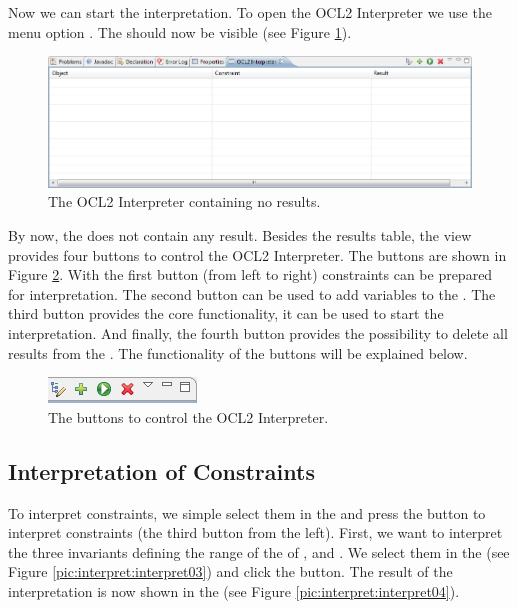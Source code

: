 Now we can start the interpretation. To open the \acs{OCL}2 Interpreter we use the menu option . The  should now be visible (see Figure \ref{pic:interpret:interpret01}).

\begin{figure}[!htbp]
	\centering
	\includegraphics[width=1.0\linewidth]{figures/interpreter/interpret01}
	\caption{The OCL2 Interpreter containing no results.}
	\label{pic:interpret:interpret01}
\end{figure}

By now, the  does not contain any result. Besides the results table, the view provides four buttons to control the \acs{OCL}2 Interpreter. The buttons are shown in Figure \ref{pic:interpret:interpret02}. With the first button (from left to right) constraints can be prepared for interpretation. The second button can be used to add variables to the . The third button provides the core functionality, it can be used to start the interpretation. And finally, the fourth button provides the possibility to delete all results from the . The functionality of the buttons will be explained below.

\begin{figure}[!htbp]
	\centering
	\includegraphics[width=0.5\linewidth]{figures/interpreter/interpret02}
	\caption{The buttons to control the OCL2 Interpreter.}
	\label{pic:interpret:interpret02}
\end{figure}


\subsection{Interpretation of Constraints}

To interpret constraints, we simple select them in the  and press the button to interpret constraints (the third button from the left). First, we want to interpret the three invariants defining the range of the  of ,  and . We select them in the  (see Figure \ref{pic:interpret:interpret03}) and click the  button. The result of the interpretation is now shown in the  (see Figure \ref{pic:interpret:interpret04}).

